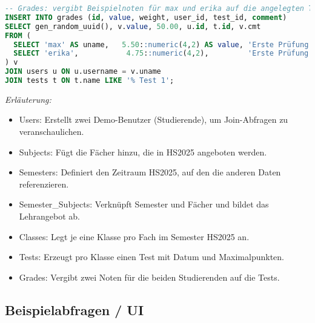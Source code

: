 \documentclass[12pt,a4paper]{article}
\begin{document}
\begin{lstlisting}[language=SQL]
-- Grades: vergibt Beispielnoten für max und erika auf die angelegten Tests
INSERT INTO grades (id, value, weight, user_id, test_id, comment)
SELECT gen_random_uuid(), v.value, 50.00, u.id, t.id, v.cmt
FROM (
  SELECT 'max' AS uname,   5.50::numeric(4,2) AS value, 'Erste Prüfung'::varchar(255) AS cmt UNION ALL
  SELECT 'erika',           4.75::numeric(4,2),         'Erste Prüfung'
) v
JOIN users u ON u.username = v.uname
JOIN tests t ON t.name LIKE '% Test 1';
    \end{lstlisting}

    \textit{Erläuterung:}
    \begin{itemize}
        \item Users: Erstellt zwei Demo-Benutzer (Studierende), um Join-Abfragen zu veranschaulichen.
        \item Subjects: Fügt die Fächer hinzu, die in HS2025 angeboten werden.
        \item Semesters: Definiert den Zeitraum HS2025, auf den die anderen Daten referenzieren.
        \item Semester\_Subjects: Verknüpft Semester und Fächer und bildet das Lehrangebot ab.
        \item Classes: Legt je eine Klasse pro Fach im Semester HS2025 an.
        \item Tests: Erzeugt pro Klasse einen Test mit Datum und Maximalpunkten.
        \item Grades: Vergibt zwei Noten für die beiden Studierenden auf die Tests.
    \end{itemize}


    \subsection{Beispielabfragen / UI}
\end{document}
